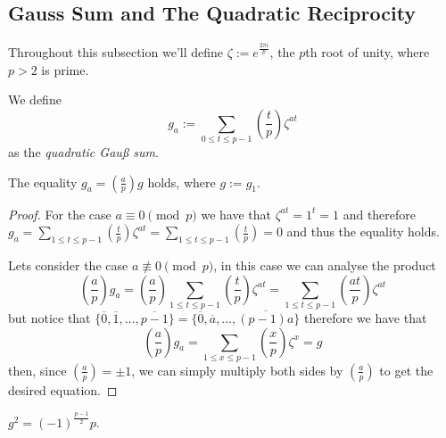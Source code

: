 \subsection{Gauss Sum and The Quadratic Reciprocity}

Throughout this subsection we'll define \(\zeta := e^{\frac{2\pi i}{p}}\), the
\(p\)th root of unity, where \(p > 2\) is prime.

\begin{definition}
    We define \[g_a := \sum_{0 \leqslant t \leqslant p-1} \left( \frac{t}{p}
        \right) \zeta^{at}\] as the \emph{quadratic Gau{\ss} sum}.
\end{definition}

\begin{proposition}
    The equality \(g_a = \left( \frac{a}{p} \right) g\) holds, where \(g:=g_1\).
\end{proposition}

\begin{proof}
    For the case \(a \equiv 0 \pmod{p}\) we have that \(\zeta^{at} = 1^t = 1\)
    and therefore \(g_a = \sum_{1 \leqslant t \leqslant p-1} \left( \frac{t}{p}
    \right) \zeta^{at} = \sum_{1 \leqslant t \leqslant p-1} \left( \frac{t}{p}
    \right) = 0\) and thus the equality holds.

    Lets consider the case \(a \not\equiv 0 \pmod{p}\), in this case we can
    analyse the product
    \[
        \left( \frac{a}{p} \right) g_a = \left( \frac{a}{p} \right) \sum_{1
            \leqslant t \leqslant p-1} \left( \frac{t}{p} \right) \zeta^{at} =
        \sum_{1 \leqslant t \leqslant p-1} \left( \frac{at}{p} \right) \zeta^{at}
    \]
    but notice that \(\{\overline{0}, \overline{1}, \dots, \overline{p-1}\} =
    \{\overline{0}, \overline{a}, \dots, \overline{(p-1)a}\}\) therefore we have
    that
    \[
        \left( \frac{a}{p} \right) g_a = \sum_{1 \leqslant x \leqslant p-1} \left(
        \frac{x}{p}\right) \zeta^x = g
    \]
    then, since \(\left( \frac{a}{p} \right) = \pm 1\), we can simply multiply
    both sides by \(\left( \frac{a}{p} \right)\) to get the desired equation.
\end{proof}

\begin{proposition}
    \(g^2 = (-1)^{\frac{p-1}{2}} p\).
\end{proposition}

